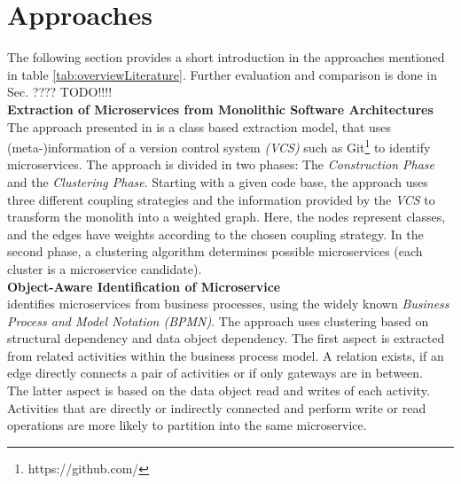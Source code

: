 \clearpage





\section{Approaches}
The following section provides a short introduction in the approaches mentioned in table \ref{tab:overviewLiterature}. Further evaluation and comparison is done in Sec. ???? TODO!!!! \\

\noindent
\textbf{Extraction of Microservices from Monolithic Software Architectures   } \\
The approach presented in \cite{ExtractionMazlami} is a class based extraction model, that uses (meta-)information of a version control system \textit{(VCS)} such as Git\footnote{https://github.com/} to identify microservices. The approach is divided in two phases: The \textit{Construction Phase} and the \textit{Clustering Phase}.
Starting with a given code base, the approach uses three different coupling strategies and the information provided by the \textit{VCS} to transform the monolith into a weighted graph. Here, the nodes represent classes, and the edges have weights according to the chosen coupling strategy. In the second phase, a clustering algorithm determines possible microservices (each cluster is a microservice candidate). \\

\noindent
\textbf{Object-Aware Identification of Microservice  } \\
\cite{ObjectAwareAmiri} identifies microservices from business processes, using the widely known \textit{Business Process and Model Notation (BPMN)}. The approach uses clustering based on structural dependency and data object dependency. The first aspect is extracted from related activities within the business process model. A relation exists, if an edge directly connects a pair of activities or if only gateways are in between. \\
The latter aspect is based on the data object read and writes of each activity. Activities that are directly or indirectly connected and perform write or read operations are more likely to partition into the same microservice. \\


